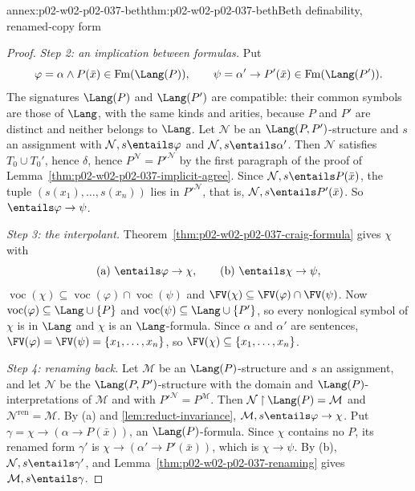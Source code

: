 \begin{annexitem}{annex:p02-w02-p02-037-beth}{thm:p02-w02-p02-037-beth}{Beth definability, renamed-copy form}
\begin{proof}
\emph{Step 2: an implication between formulas.}  Put
\[
 \varphi=\alpha\land P(\bar x)\in\operatorname{Fm}(\Lang(P)),
 \qquad
 \psi=\alpha'\to P'(\bar x)\in\operatorname{Fm}(\Lang(P')).
\]
The signatures \(\Lang(P)\) and \(\Lang(P')\) are compatible: their common
symbols are those of \(\Lang\), with the same kinds and arities, because
\(P\) and \(P'\) are distinct and neither belongs to \(\Lang\).  Let
\(\mathcal N\) be an \(\Lang(P,P')\)-structure and \(s\) an assignment
with \(\mathcal N,s\entails\varphi\) and \(\mathcal N,s\entails\alpha'\).
Then \(\mathcal N\) satisfies \(T_0\cup T_0'\), hence \(\delta\), hence
\(P^{\mathcal N}=P'^{\mathcal N}\) by the first paragraph of the proof of
Lemma~\ref{thm:p02-w02-p02-037-implicit-agree}.  Since
\(\mathcal N,s\entails P(\bar x)\), the tuple
\((s(x_1),\ldots,s(x_n))\) lies in \(P'^{\mathcal N}\), that is,
\(\mathcal N,s\entails P'(\bar x)\).  So \(\entails\varphi\to\psi\).

\emph{Step 3: the interpolant.}  Theorem~\ref{thm:p02-w02-p02-037-craig-formula}
gives \(\chi\) with
\[
 \text{(a)}\ \entails\varphi\to\chi,
 \qquad
 \text{(b)}\ \entails\chi\to\psi,
\]
\(\operatorname{voc}(\chi)\subseteq\operatorname{voc}(\varphi)\cap
\operatorname{voc}(\psi)\) and
\(\FV(\chi)\subseteq\FV(\varphi)\cap\FV(\psi)\).  Now
\(\operatorname{voc}(\varphi)\subseteq\Lang\cup\{P\}\) and
\(\operatorname{voc}(\psi)\subseteq\Lang\cup\{P'\}\), so every nonlogical
symbol of \(\chi\) is in \(\Lang\) and \(\chi\) is an \(\Lang\)-formula.
Since \(\alpha\) and \(\alpha'\) are sentences,
\(\FV(\varphi)=\FV(\psi)=\{x_1,\ldots,x_n\}\), so
\(\FV(\chi)\subseteq\{x_1,\ldots,x_n\}\).

\emph{Step 4: renaming back.}  Let \(\mathcal M\) be an
\(\Lang(P)\)-structure and \(s\) an assignment, and let \(\mathcal N\) be
the \(\Lang(P,P')\)-structure with the domain and \(\Lang(P)\)-interpretations
of \(\mathcal M\) and with \(P'^{\mathcal N}=P^{\mathcal M}\).  Then
\(\mathcal N\mathbin{\upharpoonright}\Lang(P)=\mathcal M\) and
\(\mathcal N^{\mathrm{ren}}=\mathcal M\).  By (a) and
\cref{lem:reduct-invariance}, \(\mathcal M,s\entails\varphi\to\chi\).  Put
\(\gamma=\chi\to(\alpha\to P(\bar x))\), an \(\Lang(P)\)-formula.  Since
\(\chi\) contains no \(P\), its renamed form \(\gamma'\) is
\(\chi\to(\alpha'\to P'(\bar x))\), which is \(\chi\to\psi\).  By (b),
\(\mathcal N,s\entails\gamma'\), and
Lemma~\ref{thm:p02-w02-p02-037-renaming} gives
\(\mathcal M,s\entails\gamma\).


\end{proof}
\end{annexitem}
